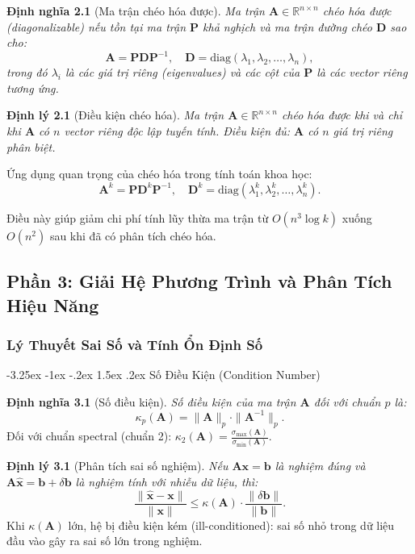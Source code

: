 \documentclass[12pt]{article}
\makeatletter
\newcommand\subsubsubsection{\@startsection{paragraph}{4}{\z@}%
    {-3.25ex \@plus -1ex \@minus -.2ex}%
    {1.5ex \@plus .2ex}%
    {\normalfont\normalsize\bfseries}}
\makeatother
\begin{document}
\textbf{Định nghĩa 2.1} (Ma trận chéo hóa được). \textit{Ma trận $\mathbf{A} \in \mathbb{R}^{n \times n}$ chéo hóa được (diagonalizable) nếu tồn tại ma trận $\mathbf{P}$ khả nghịch và ma trận đường chéo $\mathbf{D}$ sao cho:}
\begin{equation}
\mathbf{A} = \mathbf{PDP}^{-1}, \quad \mathbf{D} = \text{diag}(\lambda_1, \lambda_2, \dots, \lambda_n),
\end{equation}
\textit{trong đó $\lambda_i$ là các giá trị riêng (eigenvalues) và các cột của $\mathbf{P}$ là các vector riêng tương ứng.}

\textbf{Định lý 2.1} (Điều kiện chéo hóa). \textit{Ma trận $\mathbf{A} \in \mathbb{R}^{n \times n}$ chéo hóa được khi và chỉ khi $\mathbf{A}$ có $n$ vector riêng độc lập tuyến tính. Điều kiện đủ: $\mathbf{A}$ có $n$ giá trị riêng phân biệt.}

Ứng dụng quan trọng của chéo hóa trong tính toán khoa học:
\begin{equation}
\mathbf{A}^k = \mathbf{PD}^k\mathbf{P}^{-1}, \quad \mathbf{D}^k = \text{diag}(\lambda_1^k, \lambda_2^k, \dots, \lambda_n^k).
\end{equation}

Điều này giúp giảm chi phí tính lũy thừa ma trận từ $O(n^3 \log k)$ xuống $O(n^2)$ sau khi đã có phân tích chéo hóa.

\subsection{Phần 3: Giải Hệ Phương Trình và Phân Tích Hiệu Năng}

\subsubsection{Lý Thuyết Sai Số và Tính Ổn Định Số}

\subsubsubsection{Số Điều Kiện (Condition Number)}

\textbf{Định nghĩa 3.1} (Số điều kiện). \textit{Số điều kiện của ma trận $\mathbf{A}$ đối với chuẩn $p$ là:}
\begin{equation}
\kappa_p(\mathbf{A}) = \|\mathbf{A}\|_p \cdot \|\mathbf{A}^{-1}\|_p.
\end{equation}
Đối với chuẩn spectral (chuẩn 2): $\kappa_2(\mathbf{A}) = \frac{\sigma_{\max}(\mathbf{A})}{\sigma_{\min}(\mathbf{A})}$.

\textbf{Định lý 3.1} (Phân tích sai số nghiệm). \textit{Nếu $\mathbf{Ax} = \mathbf{b}$ là nghiệm đúng và $\mathbf{A\hat{x}} = \mathbf{b} + \delta \mathbf{b}$ là nghiệm tính với nhiễu dữ liệu, thì:}
\begin{equation}
\frac{\|\mathbf{\hat{x}} - \mathbf{x}\|}{\|\mathbf{x}\|} \le \kappa(\mathbf{A}) \cdot \frac{\|\delta \mathbf{b}\|}{\|\mathbf{b}\|}.
\end{equation}
Khi $\kappa(\mathbf{A})$ lớn, hệ bị điều kiện kém (ill-conditioned): sai số nhỏ trong dữ liệu đầu vào gây ra sai số lớn trong nghiệm.
\end{document}
